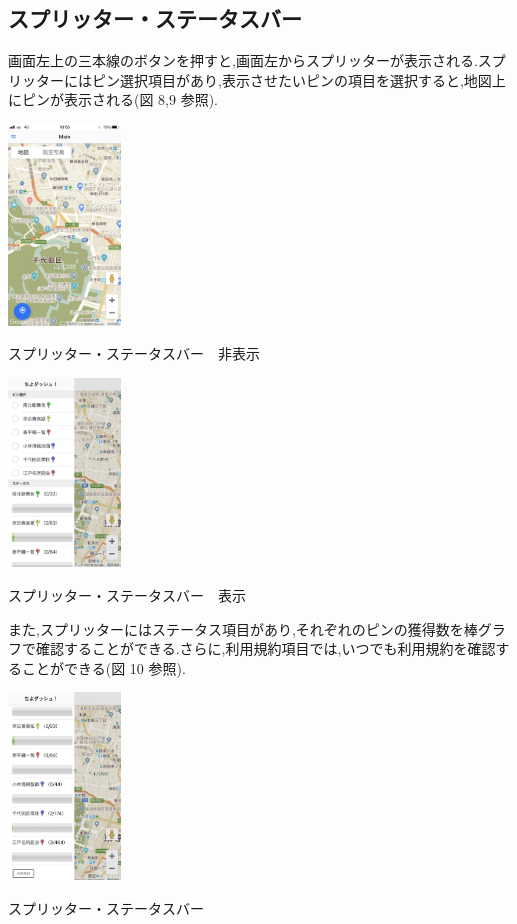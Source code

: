 \documentclass[a4paper, twoside]{jarticle}
\makeatletter
\newenvironment{figurehere}
  {\def\@captype{figure}}
  {}
\makeatother
\begin{document}
\begin{multicols}{2}
\subsection{スプリッター・ステータスバー}
画面左上の三本線のボタンを押すと,画面左からスプリッターが表示される.スプリッターにはピン選択項目があり,表示させたいピンの項目を選択すると,地図上にピンが表示される(図 8,9 参照).
\begin{figurehere}
\begin{center}
\includegraphics[bb=30 50 550 1300,width=3cm]{./image09-0.jpg}%
\end{center}
\caption{スプリッター・ステータスバー　非表示}\label{fig:8}
\begin{center}
\includegraphics[bb=30 50 550 1300,width=3cm]{./image09.jpg}%
\end{center}
\caption{スプリッター・ステータスバー　表示}\label{fig:9}
\end{figurehere}

また,スプリッターにはステータス項目があり,それぞれのピンの獲得数を棒グラフで確認することができる.さらに,利用規約項目では,いつでも利用規約を確認することができる(図 10 参照).
\begin{figurehere}
\begin{center}
\includegraphics[bb=30 50 550 1300,width=3cm]{./image10.jpg}%
\end{center}
\caption{スプリッター・ステータスバー}\label{fig:10}
\end{figurehere}



\end{multicols}
\end{document}
